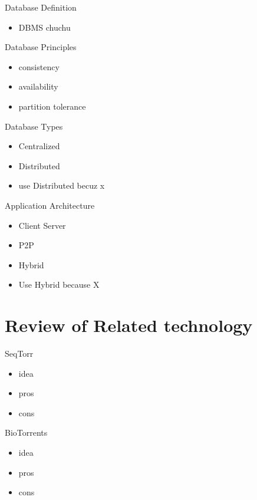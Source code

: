 \documentclass{beamer}
\begin{document}
\begin{frame}{Database Definition}
  \begin{itemize}   
    \item DBMS chuchu
  \end{itemize}
\end{frame}

\begin{frame}{Database Principles}
  \begin{itemize}   
    \item consistency
    \item availability
    \item partition tolerance
  \end{itemize}
\end{frame}

\begin{frame}{Database Types}
  \begin{itemize}   
    \item Centralized
    \item Distributed
    \item use Distributed becuz x
  \end{itemize}
\end{frame}

\begin{frame}{Application Architecture}
  \begin{itemize}   
    \item Client Server
    \item P2P
    \item Hybrid
    \item Use Hybrid because X
  \end{itemize}
\end{frame}

\section{Review of Related technology}

\begin{frame}{SeqTorr}
  \begin{itemize}   
    \item idea
    \item pros
    \item cons
  \end{itemize}
\end{frame}

\begin{frame}{BioTorrents}
  \begin{itemize}   
    \item idea
    \item pros
    \item cons
  \end{itemize}
\end{frame}
\end{document}
